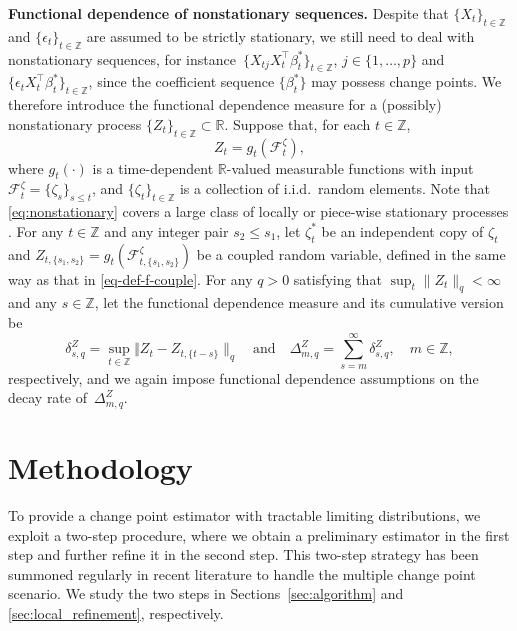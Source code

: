 \documentclass[11pt]{article}
\theoremstyle{plain}
\theoremstyle{definition}
\begin{document}
\medskip
\noindent \textbf{Functional dependence of nonstationary sequences.}  Despite that $\{X_t\}_{t \in \mathbb{Z}}$ and $\{\epsilon_t\}_{t \in \mathbb{Z}}$ are assumed to be strictly stationary, we still need to deal with nonstationary sequences, for instance~$\{X_{tj}X_t^{\top}\beta^*_t\}_{t \in \mathbb{Z}}$, $j \in \{1, \ldots, p\}$ and $\{\epsilon_tX_t^{\top}\beta^*_t\}_{t \in \mathbb{Z}}$, since the coefficient sequence $\{\beta_t^*\}$ may possess change points.  We therefore introduce the functional dependence measure for a (possibly) nonstationary process $\{Z_t\}_{t \in \mathbb{Z}} \subset \mathbb{R}$.  Suppose that, for each $t \in \mathbb{Z}$,
\begin{equation}\label{eq:nonstationary}
    Z_t = g_t(\mathcal{F}_t^{\zeta}),
\end{equation}
where $g_t(\cdot)$ is a time-dependent $\mathbb{R}$-valued measurable functions with input $\mathcal{F}_t^{\zeta} = \{\zeta_s\}_{s \leq t}$, and $\{\zeta_t\}_{t \in \mathbb{Z}}$ is a collection of i.i.d.\ random elements.  Note that \eqref{eq:nonstationary} covers a large class of locally or piece-wise stationary processes \citep[e.g.][]{dahlhaus2019towards, chen2021inference}.  For any $t \in \mathbb{Z}$ and any integer pair $s_2 \leq s_1$, let $\zeta_t^*$ be an independent copy of $\zeta_t$ and $Z_{t, \{s_1, s_2\}} = g_t(\mathcal{F}^\zeta_{t, \{s_1, s_2\}})$ be a coupled random variable, defined in the same way as that in \eqref{eq-def-f-couple}.  For any $q > 0$ satisfying that $\sup_t\|Z_t\|_q < \infty$ and any $s \in \mathbb{Z}$, let the functional dependence measure and its cumulative version be
\begin{equation}\label{eq:fdm_nonstationary}
    \delta_{s, q} ^Z  = \sup_{t \in \mathbb{Z}}\Vert Z_{t} - Z_{t,\{t-s\}} \|_q \quad \text{and} \quad \Delta^Z_{m, q} = \sum_{s = m}^{\infty}\delta^Z_{s, q}, \quad m \in \mathbb{Z},
\end{equation}
respectively, and we again impose functional dependence assumptions on the decay rate of~$\Delta^Z_{m, q}$.

\section{Methodology}\label{sec:method}

To provide a change point estimator with tractable limiting distributions, we exploit a two-step procedure, where we obtain a preliminary estimator in the first step and further refine it in the second step. This two-step strategy has been summoned regularly in recent literature to handle the multiple change point scenario.  We study the two steps in Sections~\ref{sec:algorithm} and \ref{sec:local_refinement}, respectively.
\end{document}
